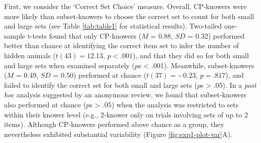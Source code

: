 \documentclass[
  man,floatsintext]{apa7}
\begin{document}
First, we consider the `Correct Set Choice' measure. Overall, CP-knowers were more likely than subset-knowers to choose the correct set to count for both small and large sets (see Table \ref{tab:table1} for statistical results).
Two-tailed one-sample t-tests found that only CP-knowers (\(M\) = 0.88, \(SD\) = 0.32) performed better than chance at identifying the correct item set to infer the number of hidden animals (\(t(43) = 12.13\), \(p < .001\)), and that they did so for both small and large sets when examined separately (\(p\)s \textless{} .001). Meanwhile, subset-knowers (\(M\) = 0.49, \(SD\) = 0.50) performed at chance (\(t(37) = -0.23\), \(p = .817\)), and failed to identify the correct set for both small and large sets (\(p\)s \textgreater{} .05). In a \emph{post hoc} analysis suggested by an anonymous review, we found that subset-knowers also performed at chance (\(p\)s \textgreater{} .05) when the analysis was restricted to sets within their knower level (e.g., 2-knower only on trials involving sets of up to 2 items). Although CP-knowers performed above chance as a group, they nevertheless exhibited substantial variability (Figure \ref{fig:exp1-plot-var}A).
\end{document}
